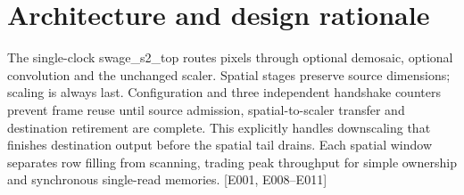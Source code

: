 \documentclass[11pt,a4paper]{article}
\begin{document}
\section{Architecture and design rationale}

The single-clock swage\_\allowbreak{}s2\_\allowbreak{}top routes pixels through optional demosaic,\allowbreak{} optional convolution and the unchanged scaler. Spatial stages preserve source dimensions; scaling is always last. Configuration and three independent handshake counters prevent frame reuse until source admission,\allowbreak{} spatial-to-scaler transfer and destination retirement are complete. This explicitly handles downscaling that finishes destination output before the spatial tail drains. Each spatial window separates row filling from scanning,\allowbreak{} trading peak throughput for simple ownership and synchronous single-read memories. [\allowbreak{}E001,\allowbreak{} E008–E011]\allowbreak{}
\end{document}
